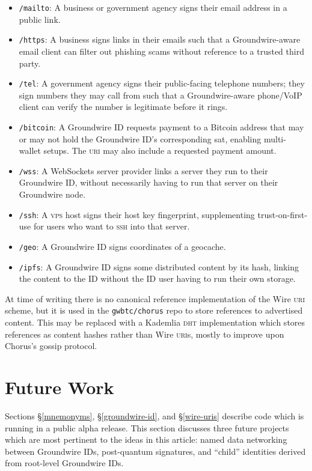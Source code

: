 \documentclass[twoside]{article}
\begin{document}
\begin{itemize}[noitemsep,topsep=2pt]

\item
  \texttt{/mailto}: A business or government agency signs their email
  address in a public link.
\item
  \texttt{/https}: A business signs links in their emails such that a
  Groundwire-aware email client can filter out phishing scams without
  reference to a trusted third party.
\item
  \texttt{/tel}: A government agency signs their public-facing telephone
  numbers; they sign numbers they may call from such that a
  Groundwire-aware phone/VoIP client can verify the number is
  legitimate before it rings.
\item
  \texttt{/bitcoin}: A Groundwire ID requests payment to a Bitcoin
  address that may or may not hold the Groundwire ID's corresponding
  sat, enabling multi-wallet setups. The \textsc{uri} may also include a
  requested payment amount.
\item
  \texttt{/wss}: A WebSockets server provider links a server they run to
  their Groundwire ID, without necessarily having to run that server on
  their Groundwire node.
\item
  \texttt{/ssh}: A \textsc{vps} host signs their host key fingerprint,
  supplementing trust-on-first-use for users who want to \textsc{ssh} into that
  server.
\item
  \texttt{/geo}: A Groundwire ID signs coordinates of a geocache.
\item
  \texttt{/ipfs}: A Groundwire ID signs some distributed content by its
  hash, linking the content to the ID without the ID user having to run
  their own storage.
\end{itemize}

At time of writing there is no canonical reference implementation of the
Wire \textsc{uri} scheme, but it is used in the \texttt{gwbtc/chorus} repo to
store references to advertised content. This may be replaced with a
Kademlia \textsc{dht} implementation which stores references as content hashes
rather than Wire \textsc{uri}s, mostly to improve upon Chorus's gossip protocol.

\section{Future Work}\label{future-work}

Sections \S\ref{mnemonyms}, \S\ref{groundwire-id}, and \S\ref{wire-uris} describe code which is running in a public alpha
release. This section discusses three future projects which are most
pertinent to the ideas in this article: named data networking between
Groundwire IDs, post-quantum signatures, and ``child'' identities
derived from root-level Groundwire IDs.
\end{document}
